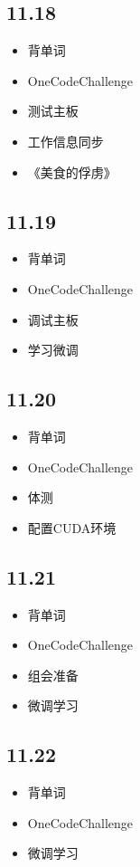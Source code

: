 \documentclass[UTF8]{ctexart}
\begin{document}
\subsection*{11.18}
\begin{itemize}
    \item 背单词
    \item OneCodeChallenge
    \item 测试主板
    \item 工作信息同步
    \item 《美食的俘虏》
\end{itemize}

\subsection*{11.19}
\begin{itemize}
    \item 背单词
    \item OneCodeChallenge
    \item 调试主板
    \item 学习微调
\end{itemize}

\subsection*{11.20}
\begin{itemize}
    \item 背单词
    \item OneCodeChallenge
    \item 体测
    \item 配置CUDA环境
\end{itemize}

\subsection*{11.21}
\begin{itemize}
    \item 背单词
    \item OneCodeChallenge
    \item 组会准备
    \item 微调学习
\end{itemize}

\subsection*{11.22}
\begin{itemize}
    \item 背单词
    \item OneCodeChallenge
    \item 微调学习
\end{itemize}
\end{document}
